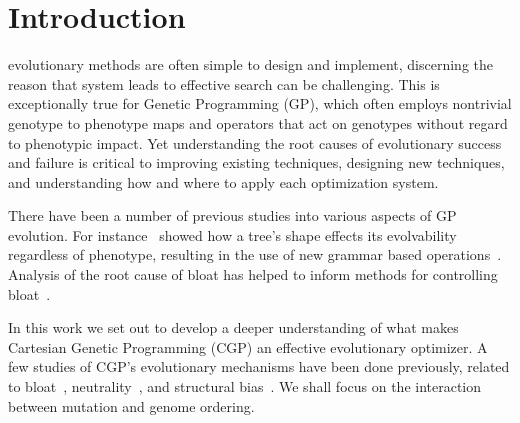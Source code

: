 \documentclass[journal]{IEEEtran}
\begin{document}
%
\IEEEpeerreviewmaketitle



\section{Introduction}
% 
% 
% 
% 
 evolutionary methods are often simple to design
and implement, discerning the reason that system
leads to effective search can be challenging.
This is exceptionally
true for Genetic Programming (GP), which often employs nontrivial
genotype to phenotype maps and operators that act on genotypes without regard to
phenotypic impact.  Yet understanding the root causes of evolutionary success
and failure is critical to improving existing techniques, designing new techniques,
and understanding how and where to apply each optimization system.

There have been a number of previous studies into various aspects of GP evolution.
For instance~\cite{daida3:2003:treebias} showed how a tree's shape effects its evolvability
regardless of phenotype,
resulting in the use of new grammar based operations~\cite{xuan:2006:grammar}.
Analysis of the root cause of bloat has helped to inform methods for controlling
bloat~\cite{luke:2006:bloat}.

In this work we set out to develop a deeper understanding of what makes Cartesian
Genetic Programming (CGP) an effective evolutionary optimizer.
A few studies of CGP's evolutionary mechanisms have
been done previously, related to bloat~\cite{miller:2001:bloat},
neutrality~\cite{vassilev:2000:neutrality}, and structural bias~\cite{payne:2009:bias}.
We shall focus on the interaction between mutation and genome ordering.
\end{document}

